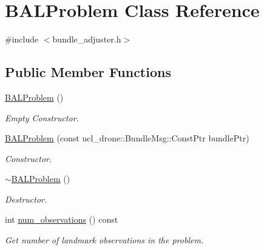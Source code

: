 \hypertarget{classBALProblem}{}\section{B\+A\+L\+Problem Class Reference}
\label{classBALProblem}


{\ttfamily \#include $<$bundle\+\_\+adjuster.\+h$>$}

\subsection*{Public Member Functions}
\begin{DoxyCompactItemize}
\item 
\mbox{\label{classBALProblem_accc972616862be896a2d018946989eb2}} 
\hyperlink{classBALProblem_accc972616862be896a2d018946989eb2}{B\+A\+L\+Problem} ()
\begin{DoxyCompactList}\small\item\em Empty Constructor. \end{DoxyCompactList}\item 
\hyperlink{classBALProblem_adb33eb5929766ce616575e54a93a214f}{B\+A\+L\+Problem} (const ucl\+\_\+drone\+::\+Bundle\+Msg\+::\+Const\+Ptr bundle\+Ptr)
\begin{DoxyCompactList}\small\item\em Constructor. \end{DoxyCompactList}\item 
\mbox{\label{classBALProblem_a15ede54c9418e6874b348af1e06b034b}} 
\hyperlink{classBALProblem_a15ede54c9418e6874b348af1e06b034b}{$\sim$\+B\+A\+L\+Problem} ()
\begin{DoxyCompactList}\small\item\em Destructor. \end{DoxyCompactList}\item 
\mbox{\label{classBALProblem_ace84d9674b5c79b731b04d3a86b0cd6d}} 
int \hyperlink{classBALProblem_ace84d9674b5c79b731b04d3a86b0cd6d}{num\+\_\+observations} () const
\begin{DoxyCompactList}\small\item\em Get number of landmark observations in the problem. \end{DoxyCompactList}\item 
\mbox{\label{classBALProblem_a276ca464f09f2fe5a76e0c2bc0afe57f}} 

\end{DoxyCompactItemize}
